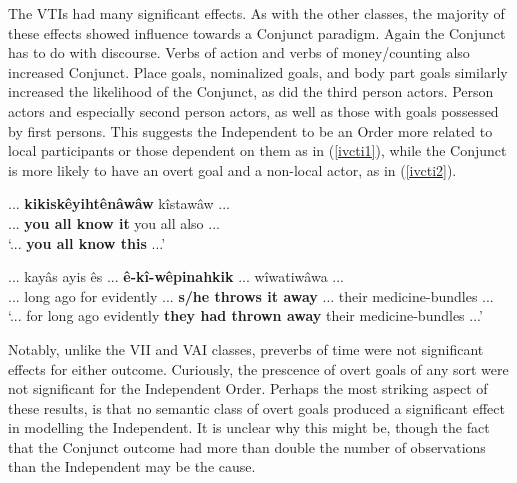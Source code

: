 The VTIs had many significant effects. As with the other classes, the majority of these effects showed influence towards a Conjunct paradigm.  Again the Conjunct has to do with discourse. Verbs of action and verbs of money/counting also increased Conjunct. Place goals, nominalized goals, and body part goals similarly increased the likelihood of the Conjunct, as did the third person actors. Person actors and especially second person actors, as well as those with goals possessed by first persons. This suggests the Independent to be an Order more related to local participants or those dependent on them as in (\ref{ivcti1}), while the Conjunct is more likely to have an overt goal and a non-local actor, as in (\ref{ivcti2}).

\begin{exe}
\ex
\gll ... \textbf{kikiskêyihtênâwâw} kîstawâw ...\\
     ... {\textbf{you all know it}} {you all also} ...\\
\trans `... \textbf{you all know this} ...' \citep[40]{AhenakewAlice2000}
\label{ivcti1}
\end{exe}

\begin{exe}
\ex
\gll ... kayâs      ayis ês        ... \textbf{ê-kî-wêpinahkik}       ... wîwatiwâwa           ...\\
     ... {long ago} for  evidently ... {\textbf{s/he throws it away}} ... {their medicine-bundles} ...\\
\trans `... for long ago evidently \textbf{they had thrown away} their medicine-bundles ...' \citep[164]{AhenakewAlice2000}
\label{ivcti2}
\end{exe}

Notably, unlike the VII and VAI classes, preverbs of time were not significant effects for either outcome. Curiously, the prescence of overt goals of any sort were not significant for the Independent Order. Perhaps the most striking aspect of these results, is that no semantic class of overt goals produced a significant effect in modelling the Independent. It is unclear why this might be, though the fact that the Conjunct outcome had more than double the number of observations than the Independent may be the cause. 


